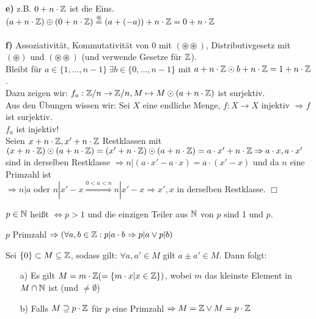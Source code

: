 \begin{bew}
\begin{itemize}
	\end{itemize}
	\textbf{e)} z.B. $0+n\cdot\mathbb{Z}$ ist die Eins. \\
	$(a+n\cdot\mathbb{Z})\oplus(0+n\cdot\mathbb{Z})\stackrel{\circledast}{=}(a+(-a))+n\cdot\mathbb{Z}=0+n\cdot\mathbb{Z}$\\
	\\
	\textbf{f)} Assoziativität, Kommutativität von $0$ mit $(\circledast\circledast)$, Distributivgesetz mit $(\circledast)$ und $(\circledast\circledast)$ (und verwende Gesetze für $\mathbb{Z}$).\\
	Bleibt \zz für $a\in\{1,...,n-1\}\:\exists b\in\{0,...,n-1\}$ mit $a+n\cdot\mathbb{Z}\odot b+n\cdot\mathbb{Z}=1+n\cdot\mathbb{Z}$. \\
	Dazu zeigen wir: $f_{a}:\mathbb{Z}/n\rightarrow\mathbb{Z}/n,M\mapsto M\odot(a+n\cdot\mathbb{Z})$ ist surjektiv.\\
	Aus den Übungen wissen wir: Sei $X$ eine endliche Menge, $f:X\rightarrow X$ injektiv $\Rightarrow f$ ist surjektiv.\\
	\zz $f_{a}$ ist injektiv!\\
	Seien $x+n\cdot\mathbb{Z},x'+n\cdot\mathbb{Z}$ Restklassen mit $(x+n\cdot\mathbb{Z})\odot(a+n\cdot\mathbb{Z})=(x'+n\cdot\mathbb{Z})\odot(a+n\cdot\mathbb{Z})=a\cdot x'+n\cdot\mathbb{Z} \\
	\Rightarrow a\cdot x,a\cdot x'$ sind in derselben Restklasse $\Rightarrow n|(a\cdot x'-a\cdot x)=a\cdot (x'-x)$ und da $n$ eine Primzahl ist\\
	$\Rightarrow n|a$ oder $n|x'-x \stackrel{0<a<n}{\Rightarrow} n|x'-x\Rightarrow x',x$ in derselben Restklasse. \hfill $\Box$
\end{bew}

\begin{defi}
	$p\in\mathbb{N}$ heißt  $\Leftrightarrow p>1$ und die einzigen Teiler aus $\mathbb{N}$ von $p$ sind 1 und $p$.
\end{defi}

\begin{satz}
	$p$ Primzahl $\Rightarrow(\forall a,b\in\mathbb{Z}:p|a\cdot b\Rightarrow p|a\vee p|b)$
\end{satz}

\begin{lem}[Übung]
	Sei $\{0\}\subset M\subseteq\mathbb{Z}$, sodass gilt: $\forall a,a'\in M$ gilt $a\pm a'\in M$. Dann folgt:
	\begin{itemize}
		\item[a)] Es gilt $M=m\cdot\mathbb{Z}(=\{m\cdot x|x\in \mathbb{Z}\})$, wobei $m$ das kleinste Element in $M\cap\mathbb{N}$ ist (und $\neq\emptyset$)
		\item[b)] Falls $M\supseteq p\cdot\mathbb{Z}$ für $p$ eine Primzahl $\Rightarrow M=\mathbb{Z}\vee M=p\cdot \mathbb{Z}$
	\end{itemize}
\end{lem}

